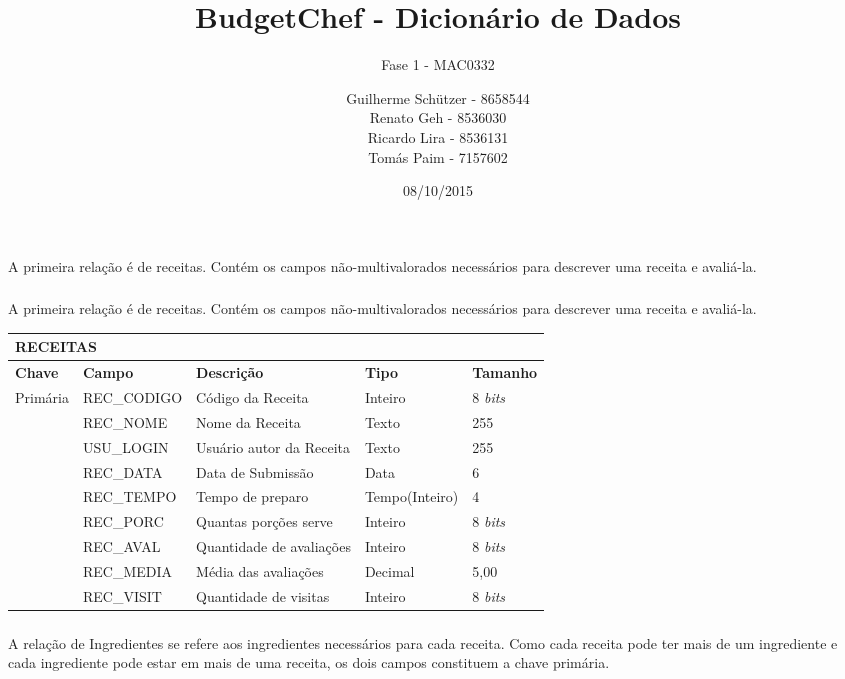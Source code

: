 \documentclass[a4paper]{article}
\title{\textbf{BudgetChef - Dicionário de Dados}}
\subtitle{Fase 1 - MAC0332}
\author{
	Guilherme Schützer - 8658544\\
	Renato Geh - 8536030\\
	Ricardo Lira - 8536131\\
	Tomás Paim - 7157602\\
}
\date{08/10/2015}
\begin{document}
\maketitle

A primeira relação é de receitas. Contém os campos não-multivalorados necessários para descrever uma receita e avaliá-la.
\subsubsection{} A primeira relação é de receitas. Contém os campos não-multivalorados necessários para descrever uma receita e avaliá-la.


\begin{center}
\begin{tabular}{ l l l l l }
  \multicolumn{5}{l}{\textbf{RECEITAS}} \\
  \hline
  \textbf{Chave} & \textbf{Campo} & \textbf{Descrição} & \textbf{Tipo} & \textbf{Tamanho} \\
  \cline{1-5}
  Primária & REC\_CODIGO & Código da Receita & Inteiro & 8 \emph{bits}  \\
   & REC\_NOME & Nome da Receita & Texto & 255 \\
   & USU\_LOGIN & Usuário autor da Receita & Texto & 255 \\
   & REC\_DATA & Data de Submissão & Data & 6 \\
   & REC\_TEMPO & Tempo de preparo & Tempo(Inteiro) & 4 \\
   & REC\_PORC & Quantas porções serve & Inteiro & 8 \emph{bits} \\
   & REC\_AVAL & Quantidade de avaliações & Inteiro & 8 \emph{bits} \\
   & REC\_MEDIA & Média das avaliações & Decimal & 5,00 \\
   & REC\_VISIT & Quantidade de visitas & Inteiro & 8 \emph{bits}
\end{tabular}
\end{center}

\vfill

\subsubsection{} A relação de Ingredientes se refere aos ingredientes necessários para cada receita. Como cada receita pode ter mais de um ingrediente e cada ingrediente pode estar em mais de uma receita, os dois campos constituem a chave primária.
\end{document}
